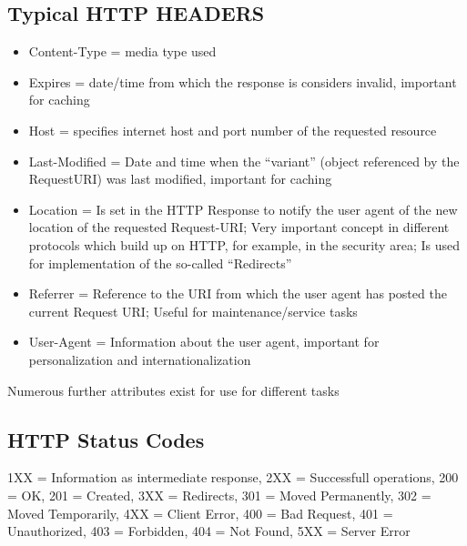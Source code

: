 \documentclass[11pt]{article}
\begin{document}
\subsection{Typical HTTP HEADERS}
\label{sec:org410e5a4}
\begin{itemize}
\item Content-Type = media type used
\item Expires = date/time from which the response is considers invalid, important for caching
\item Host = specifies internet host and port number of the requested resource
\item Last-Modified = Date and time when the “variant” (object referenced by the RequestURI) was last modified, important for caching
\item Location = Is set in the HTTP Response to notify the user agent of the new location of the requested Request-URI; Very important concept in different protocols which build up on HTTP, for example, in the security area; Is used for implementation of the so-called “Redirects”
\item Referrer = Reference to the URI from which the user agent has posted the current Request URI; Useful for maintenance/service tasks
\item User-Agent = Information about the user agent, important for personalization and internationalization
\end{itemize}

Numerous further attributes exist for use for different tasks

\subsection{HTTP Status Codes}
\label{sec:org2c8dd30}
1XX = Information as intermediate response, 2XX = Successfull operations, 200 = OK, 201 = Created, 3XX = Redirects, 301 = Moved Permanently, 302 = Moved Temporarily, 4XX = Client Error, 400 = Bad Request, 401 = Unauthorized, 403 = Forbidden, 404 = Not Found, 5XX = Server Error
\end{document}
